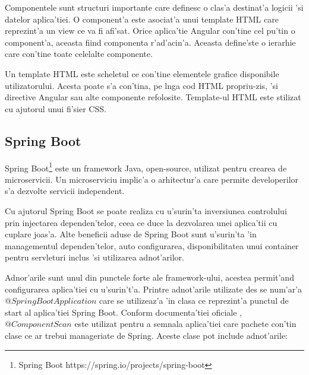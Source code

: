 \documentclass[12pt,a4paper,twoside]{report}
\begin{document}
Componentele sunt structuri importante care definesc o clas'a destinat'a logicii 'si datelor aplica'tiei. O component'a este asociat'a unui template HTML care reprezint'a un view ce va fi afi'sat. Orice aplica'tie Angular con'tine cel pu'tin o component'a, aceasta fiind componenta r'ad'acin'a. Aceasta define'ste o ierarhie care con'tine toate celelalte componente.

Un template HTML este scheletul ce con'tine elementele grafice disponibile utilizatorului. Acesta poate s'a con'tina, pe l\ia nga cod HTML propriu-zis, 'si directive Angular sau alte componente refolosite. Template-ul HTML este stilizat cu ajutorul unui fi'sier CSS.

\subsection{Spring Boot}
Spring Boot\footnote{Spring Boot https://spring.io/projects/spring-boot} este un framework Java, open-source, utilizat pentru crearea de microservicii. Un microserviciu implic'a o arhitectur'a care permite developerilor s'a dezvolte servicii independent.

Cu ajutorul Spring Boot se poate realiza cu u'surin'ta inversiunea controlului prin injectarea dependen'telor, ceea ce duce la dezvolarea unei aplica'tii cu cuplare joas'a. Alte beneficii aduse de Spring Boot sunt u'surin'ta 'in managementul dependen'telor, auto configurarea, disponibilitatea unui container pentru servleturi inclus 'si utilizarea adnot'arilor.

Adnor'arile sunt unul din punctele forte ale framework-ului, acestea permit'and configurarea aplica'tiei cu u'surin't'a. Printre adnot'arile utilizate des se num'ar'a $@SpringBootApplication$ care se utilizeaz'a 'in clasa ce reprezint'a punctul de start al aplica'tiei Spring Boot. Conform documenta'tiei oficiale \cite{springBootCite}, $@ComponentScan$ este utilizat pentru a semnala aplica'tiei care pachete con'tin clase ce ar trebui manageriate de Spring. Aceste clase pot include adnot'arile: 
\end{document}
